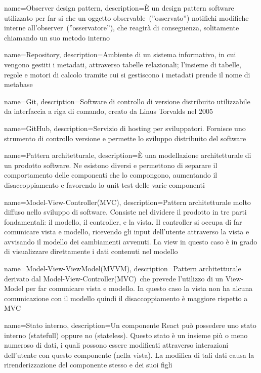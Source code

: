 {
  name={Observer design pattern},
  description={È un design pattern software utilizzato per far si che un oggetto observable\glo\ (”osservato”) notifichi modifiche interne all’observer\glo\ (”osservatore”), che reagirà di conseguenza, solitamente chiamando un suo metodo interno}
}

{
  name={Repository},
  description={Ambiente di un sistema informativo, in cui vengono gestiti i metadati, attraverso tabelle relazionali; l’insieme di tabelle, regole e motori di calcolo tramite cui si gestiscono i metadati prende il nome di metabase}
}

{
  name={Git},
  description={Software di controllo di versione distribuito utilizzabile da interfaccia a riga di comando, creato da Linus Torvalds nel 2005}
}

{
  name={GitHub},
  description={Servizio di hosting per sviluppatori. Fornisce uno strumento di controllo versione e permette lo sviluppo distribuito del software}
}

{
  name={Pattern architetturale},
  description={È una modellazione architetturale di un prodotto software. Ne esistono diversi e permettono di separare il comportamento delle componenti che lo compongono, aumentando il disaccoppiamento e favorendo lo unit-test delle varie componenti}
}

{
  name={Model-View-Controller(MVC)},
  description={Pattern architetturale molto diffuso nello sviluppo di software. Consiste nel dividere il prodotto in tre parti fondamentali: il modello, il controller, e la vista. Il controller si occupa di far comunicare vista e modello, ricevendo gli input dell’utente attraverso la vista e avvisando il modello dei cambiamenti avvenuti. La view in questo caso è in grado di visualizzare direttamente i dati contenuti nel modello}
}

{
  name={Model-View-ViewModel(MVVM)},
  description={Pattern architetturale derivato dal Model-View-Controller(MVC)\glo\ che prevede l’utilizzo di un View-Model per far comunicare vista e modello. In questo caso la vista non ha alcuna comunicazione con il modello quindi il disaccoppiamento è maggiore rispetto a MVC}
}

{
  name={Stato interno},
  description={Un componente React può possedere uno stato interno (statefull) oppure no (stateless). Questo stato è un insieme più o meno numeroso di dati, i quali possono essere modificati attraverso interazioni dell’utente con questo componente (nella vista). La modifica di tali dati causa la rirenderizzazione del componente stesso e dei suoi figli}
}

